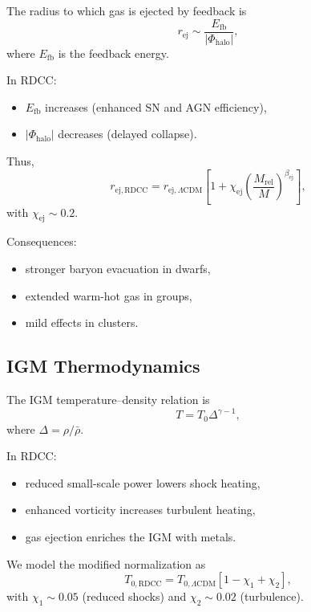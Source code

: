 \documentclass[11pt,a4paper]{article}
\begin{document}
The radius to which gas is ejected by feedback is
\begin{equation}
r_{\mathrm{ej}}
\sim
\frac{E_{\mathrm{fb}}}{|\Phi_{\mathrm{halo}}|},
\end{equation}
where $E_{\mathrm{fb}}$ is the feedback energy.

In RDCC:
\begin{itemize}
\item $E_{\mathrm{fb}}$ increases (enhanced SN and AGN efficiency),
\item $|\Phi_{\mathrm{halo}}|$ decreases (delayed collapse).
\end{itemize}

Thus,
\begin{equation}
r_{\mathrm{ej,RDCC}}
=
r_{\mathrm{ej},\Lambda\mathrm{CDM}}
\left[
1
+
\chi_{\mathrm{ej}}
\left(
\frac{M_{\mathrm{rel}}}{M}
\right)^{\beta_{\mathrm{ej}}}
\right],
\end{equation}
with $\chi_{\mathrm{ej}} \sim 0.2$.

Consequences:
\begin{itemize}
\item stronger baryon evacuation in dwarfs,
\item extended warm-hot gas in groups,
\item mild effects in clusters.
\end{itemize}

\subsection{IGM Thermodynamics}

The IGM temperature–density relation is
\begin{equation}
T
=
T_{0}
\Delta^{\gamma - 1},
\end{equation}
where $\Delta = \rho/\bar{\rho}$.

In RDCC:
\begin{itemize}
\item reduced small-scale power lowers shock heating,
\item enhanced vorticity increases turbulent heating,
\item gas ejection enriches the IGM with metals.
\end{itemize}

We model the modified normalization as
\begin{equation}
T_{0,\mathrm{RDCC}}
=
T_{0,\Lambda\mathrm{CDM}}
\left[
1
-
\chi_{1}
+
\chi_{2}
\right],
\end{equation}
with $\chi_{1} \sim 0.05$ (reduced shocks) and $\chi_{2} \sim 0.02$ (turbulence).
\end{document}
